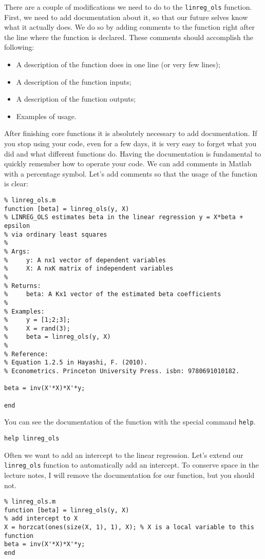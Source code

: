 \documentclass[12pt, a4paper]{article}
\begin{document}
There are a couple of modifications we need to do to the \texttt{linreg\_ols} function.
First, we need to add documentation about it, so that our future selves know what it actually does.
We do so by adding comments to the function right after the line where the function is declared.
These comments should accomplish the following:
\begin{itemize}
\item A description of the function does in one line (or very few lines);
\item A description of the function inputs;
\item A description of the function outputs;
\item Examples of usage.
\end{itemize}
After finishing core functions it is absolutely necessary to add documentation.
If you stop using your code, even for a few days, it is very easy to forget what you did and what different functions do.
Having the documentation is fundamental to quickly remember how to operate your code.
We can add comments in Matlab with a percentage symbol.
Let's add comments so that the usage of the function is clear:
\lstset{language=matlab,label= ,caption= ,captionpos=b,firstnumber=1,numbers=left,style=Matlab-editor}
\begin{lstlisting}
% linreg_ols.m
function [beta] = linreg_ols(y, X)
% LINREG_OLS estimates beta in the linear regression y = X*beta + epsilon
% via ordinary least squares
%
% Args:
%     y: A nx1 vector of dependent variables
%     X: A nxK matrix of independent variables
%
% Returns:
%     beta: A Kx1 vector of the estimated beta coefficients
%
% Examples:
%     y = [1;2;3];
%     X = rand(3);
%     beta = linreg_ols(y, X)
%
% Reference:
% Equation 1.2.5 in Hayashi, F. (2010).
% Econometrics. Princeton University Press. isbn: 9780691010182.

beta = inv(X'*X)*X'*y;

end
\end{lstlisting}
You can see the documentation of the function with the special command \texttt{help}.
\lstset{language=matlab,label= ,caption= ,captionpos=b,firstnumber=1,numbers=left,style=Matlab-editor}
\begin{lstlisting}
help linreg_ols
\end{lstlisting}

Often we want to add an intercept to the linear regression.
Let's extend our \texttt{linreg\_ols} function to automatically add an intercept.
To conserve space in the lecture notes, I will remove the documentation for our function, but you should not.
\lstset{language=matlab,label= ,caption= ,captionpos=b,firstnumber=1,numbers=left,style=Matlab-editor}
\begin{lstlisting}
% linreg_ols.m
function [beta] = linreg_ols(y, X)
% add intercept to X
X = horzcat(ones(size(X, 1), 1), X); % X is a local variable to this function
beta = inv(X'*X)*X'*y;
end
\end{lstlisting}
\end{document}
